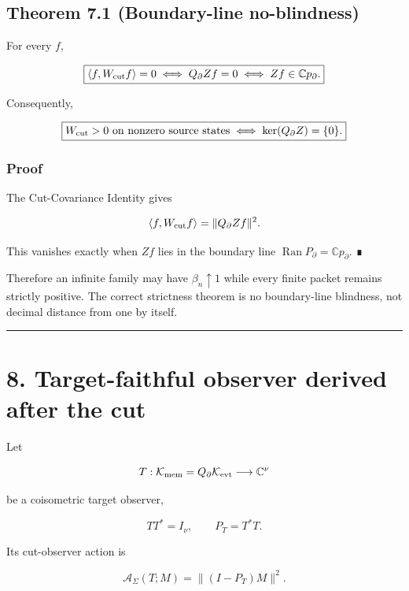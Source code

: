 \hypertarget{theorem-7.1-boundary-line-no-blindness}{%
\subsection{Theorem 7.1 (Boundary-line no-blindness)}\label{theorem-7.1-boundary-line-no-blindness}}

For every \(f\),

\[
\boxed{
\langle f,W_{\rm cut}f\rangle=0
\iff
Q_\partial Zf=0
\iff
Zf\in\mathbb C p_\partial.
}
\]

Consequently,

\[
\boxed{
W_{\rm cut}>0\text{ on nonzero source states}
\iff
\ker(Q_\partial Z)=\{0\}.
}
\]

\hypertarget{proof-2}{%
\subsubsection{Proof}\label{proof-2}}

The Cut-Covariance Identity gives

\[
\langle f,W_{\rm cut}f\rangle
=\|Q_\partial Zf\|^2.
\]

This vanishes exactly when \(Zf\) lies in the boundary line
\(\operatorname{Ran}P_\partial=\mathbb Cp_\partial\). ∎

Therefore an infinite family may have \(\beta_n\uparrow1\) while every finite
packet remains strictly positive. The correct strictness theorem is no
boundary-line blindness, not decimal distance from one by itself.

\begin{center}\rule{0.5\linewidth}{0.5pt}\end{center}

\hypertarget{target-faithful-observer-derived-after-the-cut}{%
\section{8. Target-faithful observer derived after the cut}\label{target-faithful-observer-derived-after-the-cut}}

Let

\[
T:\mathcal K_{\rm mem}=Q_\partial\mathcal K_{\rm evt}
\longrightarrow\mathbb C^\nu
\]

be a coisometric target observer,

\[
TT^*=I_\nu,
\qquad
P_T=T^*T.
\]

Its cut-observer action is

\[
\mathcal A_\Sigma(T;M)
=\|(I-P_T)M\|^2.
\]


